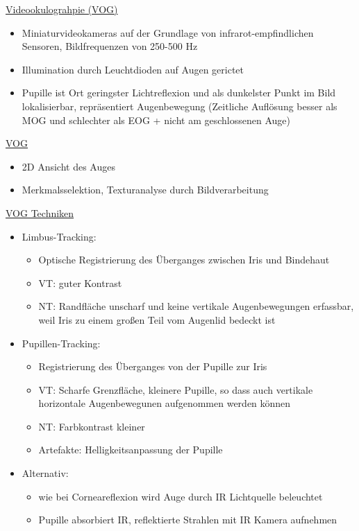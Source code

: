 \documentclass[a4paper,10pt,oneside]{article}
\begin{document}
 		
\underline{Videookulograhpie (VOG)} \\
	\begin{itemize}
		\item Miniaturvideokameras auf der Grundlage von infrarot-empfindlichen Sensoren, Bildfrequenzen von 250-500 Hz
		\item Illumination durch Leuchtdioden auf Augen gerictet
		\item Pupille ist Ort geringster Lichtreflexion und als dunkelster Punkt im Bild lokalisierbar, repräsentiert Augenbewegung (Zeitliche Auflösung besser als MOG und schlechter als EOG + nicht am geschlossenen Auge)
	\end{itemize}
	
\underline{VOG} \\
	\begin{itemize}
		\item 2D Ansicht des Auges
		\item Merkmalsselektion, Texturanalyse durch Bildverarbeitung
	\end{itemize}
 
\underline{VOG Techniken} \\
	\begin{itemize}
		\item Limbus-Tracking: 
			\begin{itemize}
				\item Optische Registrierung des Überganges zwischen Iris und Bindehaut
				\item VT: guter Kontrast
				\item NT: Randfläche unscharf und keine vertikale Augenbewegungen erfassbar, weil Iris zu einem großen Teil vom Augenlid bedeckt ist
			\end{itemize}
		\item Pupillen-Tracking:
			\begin{itemize}
				\item Registrierung des Überganges von der Pupille zur Iris
				\item VT: Scharfe Grenzfläche, kleinere Pupille, so dass auch vertikale horizontale Augenbewegunen aufgenommen werden können
				\item NT: Farbkontrast kleiner
				\item Artefakte: Helligkeitsanpassung der Pupille 
			\end{itemize}
		\item Alternativ:
			\begin{itemize}
				\item wie bei Corneareflexion wird Auge durch IR Lichtquelle beleuchtet 
				\item Pupille absorbiert IR, reflektierte Strahlen mit IR Kamera aufnehmen
			\end{itemize}
	\end{itemize}
\end{document}
